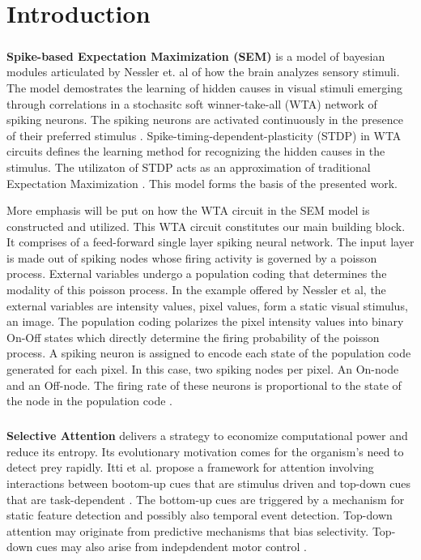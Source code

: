 \documentclass{report}
\begin{document}
\chapter*{Introduction}

\paragraph{}\textbf{Spike-based Expectation Maximization (SEM)} is a model of bayesian modules articulated by Nessler et. al of how the brain analyzes sensory stimuli. The model demostrates the learning of hidden causes in visual stimuli emerging through correlations in a stochasitc soft winner-take-all (WTA) network of spiking neurons. The spiking neurons are activated continuously in the presence of their preferred stimulus \cite{Nessler2010}. Spike-timing-dependent-plasticity (STDP) in WTA circuits defines the learning method for recognizing the hidden causes in the stimulus. The utilizaton of STDP acts as an approximation of traditional Expectation Maximization \cite{Nessler2013}. This model forms the basis of the presented work.

More emphasis will be put on how the WTA circuit in the SEM model is constructed and utilized. This WTA circuit constitutes our main building block. It comprises of a feed-forward single layer spiking neural network. The input layer is made out of spiking nodes whose firing activity is governed  by a poisson process. External variables undergo a population coding that determines the modality of this poisson process. In the example offered by Nessler et al, the external variables are intensity values, pixel values, form a static visual stimulus, an image. The population coding polarizes the pixel intensity values into binary On-Off states which directly determine the firing probability of the poisson process. A spiking neuron is assigned to encode each state of the population code generated for each pixel. In this case, two spiking nodes per pixel. An On-node and an Off-node. The firing rate of these neurons is proportional to the state of the node in the population code \cite{Nessler2010}.

\paragraph{}\textbf{Selective Attention} delivers a strategy to economize computational power and reduce its entropy. Its evolutionary motivation comes for the organism's need to detect prey rapidly. Itti et al. propose a framework for attention involving interactions between bootom-up cues that are stimulus driven and top-down cues that are task-dependent \cite{Itti2001}. The bottom-up cues are triggered by a mechanism for static feature detection and possibly also temporal event detection. Top-down attention may originate from predictive mechanisms that bias selectivity. Top-down cues may also arise from indepdendent motor control \cite{Olshausen1993}.
\end{document}
